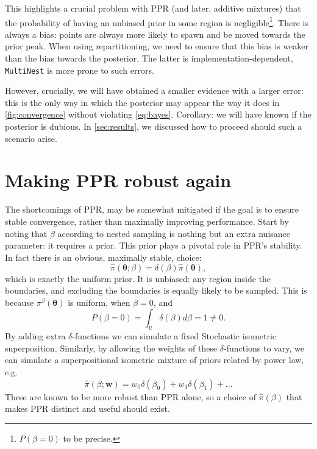 \documentclass[usenatbib]{mnras}
\begin{document}
This highlights a crucial problem with PPR (and later, additive
mixtures) that the probability of having an unbiased prior in some
region is negligible\footnote{ \(P(\beta=0)\) to be precise.}. There
is always a bias: points are always more likely to spawn and be moved
towards the prior peak. When using repartitioning, we need to ensure
that this bias is weaker than the bias towards the posterior. The
latter is implementation-dependent, \texttt{MultiNest} is more prone
to such errors.

However, crucially, we will have obtained a smaller evidence with a
larger error: this is the only way in which the posterior may appear
the way it does in \cref{fig:convergence} without violating
\cref{eq:bayes}. Corollary: we will have known if the posterior is
dubious. In \cref{sec:results}, we discussed how to proceed should
such a scenario arise.

\section{Making PPR robust again}
The shortcomings of PPR, may be somewhat mitigated if the goal is to
ensure stable convergence, rather than maximally improving
performance. Start by noting that $\beta$ according to nested sampling
is nothing but an extra nuisance parameter: it requires a prior. This
prior plays a pivotal role in PPR's stability. In fact there is an
obvious, maximally stable, choice:
\begin{equation}
  \label{}
\hat{\pi}(\bm{\theta}; \beta) = \delta(\beta) \hat{\pi}(\bm{\theta}), 
\end{equation}
which is exactly the uniform prior. It is unbiased: any region inside
the boundaries, and excluding the boundaries is equally likely to be
sampled. This is because $\pi^{\beta}(\bm{\theta})$ is uniform, when $\beta=0$, and
\begin{equation}\label{eq:PPR-uniform}
P(\beta=0) = \int_{\mathbb{R}} \delta(\beta) d\beta = 1 \ne 0. 
\end{equation}
By adding extra $\delta$-functions we can simulate a fixed Stochastic
isometric superposition. Similarly, by allowing the weights of these
$\delta$-functions to vary, we can simulate a superpositional
isometric mixture of priors related by power law, e.g.
\begin{equation}
  \label{}
  \hat{\pi}(\beta; \bm{w}) = w_{0}\delta(\beta_{0}) + w_{1}\delta(\beta_{1})+\ldots
\end{equation}
These are known to be more robust than PPR alone, so a choice of
$\hat{\pi}(\beta)$ that makes PPR distinct and useful should exist.
\end{document}
